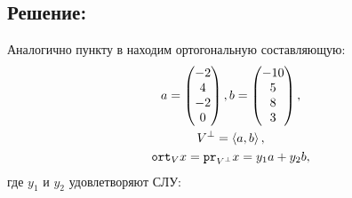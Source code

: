 \documentclass[12pt]{article}
\begin{document}
    \subsection*{Решение:}
    Аналогично пункту в находим ортогональную составляющую:
    \begin{gather*}
        a =
        \begin{pmatrix}
            -2 \\ 4 \\ -2 \\ 0
        \end{pmatrix},
        b =
        \begin{pmatrix}
            -10 \\ 5 \\ 8 \\ 3
        \end{pmatrix}, \\
        V^{\perp} = \left < a, b \right >, \\
        \texttt{ort}_{V} {x} = \texttt{pr}_{V^\perp} {x} = y_1 a + y_2 b,
    \end{gather*}
    где $y_1$ и $y_2$ удовлетворяют СЛУ:
\end{document}
